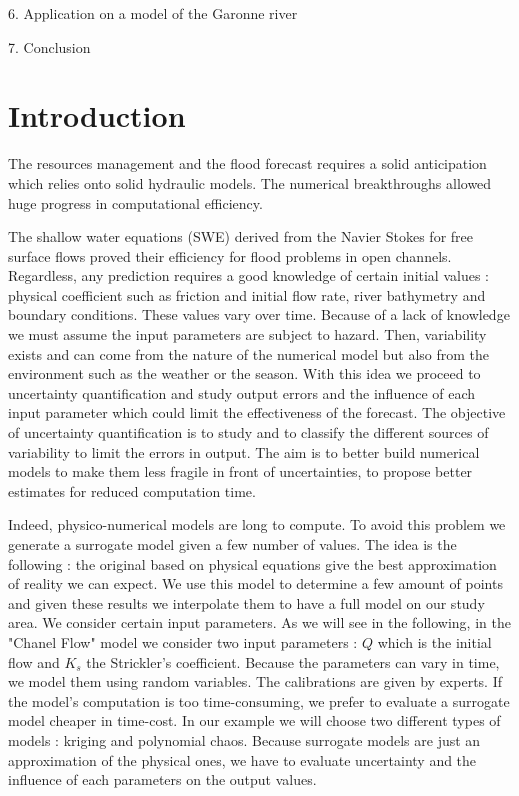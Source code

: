 \documentclass[hidelinks,12pt]{article}
\begin{document}
6.	Application on a model of the Garonne river


7.	Conclusion



\section{Introduction}

The resources management and the flood forecast requires a solid anticipation which relies onto solid hydraulic models. The numerical breakthroughs allowed huge progress in computational efficiency.

The shallow water equations (SWE) derived from the Navier Stokes for free surface flows proved their efficiency for flood problems in open channels. Regardless, any prediction requires a good knowledge of certain initial values : physical coefficient such as friction and initial flow rate, river bathymetry and boundary conditions. These values vary over time. Because of a lack of knowledge we must assume the input parameters are subject to hazard. Then, variability exists and can come from the nature of the numerical model but also from the environment such as the weather or the season. With this idea we proceed to uncertainty quantification and study output errors and the influence of each input parameter which could limit the effectiveness of the forecast. The objective of uncertainty quantification is to study and to classify the different sources of variability to limit the errors in output. The aim is to better build numerical models to make them less fragile in front of uncertainties, to propose better estimates for reduced computation time.

Indeed, physico-numerical models are long to compute. To avoid this problem we generate a surrogate model given a few number of values. The idea is the following : the original based on physical equations give the best approximation of reality we can expect. We use this model to determine a few amount of points and given these results we interpolate them to have a full model on our study area. 
We consider certain input parameters. As we will see in the following, in the "Chanel Flow" model we consider two input parameters : $Q$ which is the initial flow and $K_s$ the Strickler's coefficient. Because the parameters can vary in time, we model them using random variables. The calibrations are given by experts. 
If the model's computation is too time-consuming, we prefer to evaluate a surrogate model cheaper in time-cost. In our example we will choose two different types of models : kriging and polynomial chaos. Because surrogate models are just an approximation of the physical ones, we have to evaluate uncertainty and the influence of each parameters on the output values.
\end{document}
